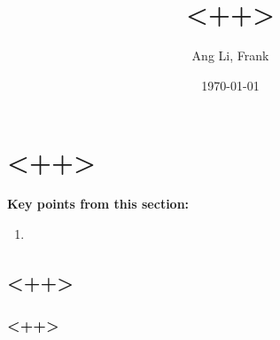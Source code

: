 \documentclass[11pt,a4paper,openany]{book}
\title{\textbf{<++>}}
\author{Ang Li, Frank}
\date{\today}
\begin{document}
\newcommand{\head}[1]{\textnormal{\textbf{#1}}}

\fancyhf{}
\renewcommand{\headrulewidth}{2pt}
\renewcommand{\footrulewidth}{1pt}
\fancyhead[LE]{\leftmark}
\fancyhead[RO]{\nouppercase{\rightmark}}
\fancyfoot[LE,RO]{\thepage}

\maketitle
\tableofcontents

\chapter{<++>}

\begin{tcolorbox}
\textbf{Key points from this section:}
\begin{enumerate}\itemsep0em
	\item <++>
\end{enumerate}
\end{tcolorbox}

\section{<++>}

\subsection{<++>}
\end{document}
